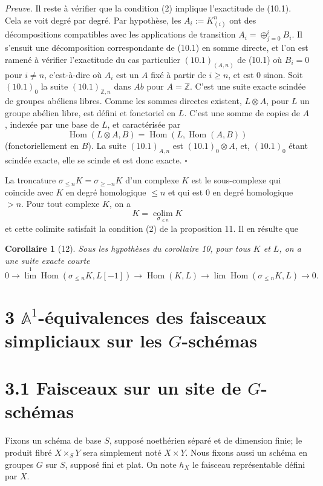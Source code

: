 \documentclass[11pt]{article}
\newcommand{\Aone}{\mathbb A^1}
\newcommand{\Z}{\mathbb Z}
\newcommand{\Hom}{\operatorname{Hom}}
\theoremstyle{deligne}
\newtheorem*{corollary*}{Corollaire}
\newenvironment{proofdel}{\noindent\textit{Preuve.}}{\hfill$\square$}
\begin{document}
\begin{proofdel}
Il reste à vérifier que la condition (2) implique l'exactitude de (10.1). Cela se voit degré par degré. Par hypothèse, les \(A_i:=K^n_{(i)}\) ont des décompositions compatibles avec les applications de transition \(A_i=\oplus_{j=0}^i B_i\). Il s'ensuit une décomposition correspondante de (10.1) en somme directe, et l'on est ramené à vérifier l'exactitude du cas particulier \((10.1)_{(A,n)}\) de (10.1) où \(B_i=0\) pour \(i\ne n\), c'est-à-dire où \(A_i\) est un \(A\) fixé à partir de \(i\ge n\), et est \(0\) sinon. Soit \((10.1)_0\) la suite \((10.1)_{\Z,n}\) dans \(Ab\) pour \(A=\Z\). C'est une suite exacte scindée de groupes abéliens libres. Comme les sommes directes existent, \(L\otimes A\), pour \(L\) un groupe abélien libre, est défini et fonctoriel en \(L\). C'est une somme de copies de \(A\), indexée par une base de \(L\), et caractérisée par
\[
\Hom(L\otimes A,B)=\Hom(L,\Hom(A,B))
\]
(fonctoriellement en \(B\)). La suite \((10.1)_{A,n}\) est \((10.1)_0\otimes A\), et, \((10.1)_0\) étant scindée exacte, elle se scinde et est donc exacte.
\end{proofdel}

La troncature \(\sigma_{\le n}K=\sigma_{\ge -n}K\) d'un complexe \(K\) est le sous-complexe qui coïncide avec \(K\) en degré homologique \(\le n\) et qui est \(0\) en degré homologique \(>n\). Pour tout complexe \(K\), on a
\[
K=\operatorname*{colim}_{\sigma_{\le n}}K
\]
et cette colimite satisfait la condition (2) de la proposition 11. Il en résulte que

\begin{corollary*}[12]
Sous les hypothèses du corollaire 10, pour tous \(K\) et \(L\), on a une suite exacte courte
\[
0\longrightarrow\operatorname{lim}^1\Hom(\sigma_{\le n}K,L[-1])
\longrightarrow\Hom(K,L)
\longrightarrow\operatorname{lim}\Hom(\sigma_{\le n}K,L)\longrightarrow0.
\]
\end{corollary*}

\section*{3 \(\Aone\)-équivalences des faisceaux simpliciaux sur les \(G\)-schémas}

\section*{3.1 Faisceaux sur un site de \(G\)-schémas}

Fixons un schéma de base \(S\), supposé noethérien séparé et de dimension finie; le produit fibré \(X\times_S Y\) sera simplement noté \(X\times Y\). Nous fixons aussi un schéma en groupes \(G\) sur \(S\), supposé fini et plat. On note \(h_X\) le faisceau représentable défini par \(X\).
\end{document}
